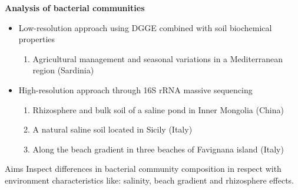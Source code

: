 \documentclass[10pt]{beamer}
\begin{document}
\begin{frame}
	\textbf{\Large{Analysis of bacterial communities}}
	\vspace{5mm}
	
	\begin{itemize}
		\item Low-resolution approach using DGGE combined with soil biochemical properties
		\begin{enumerate}
			\item Agricultural management and seasonal variations in a Mediterranean region (Sardinia)
		\end{enumerate}
		\item High-resolution approach through 16S rRNA massive sequencing
		\begin{enumerate}
			\item Rhizosphere and bulk soil of a saline pond in Inner Mongolia (China)
			\item A natural saline soil located in Sicily (Italy)
			\item Along the beach gradient in three beaches of Favignana island (Italy)		
		\end{enumerate}		
	\end{itemize}
	\vspace{3mm}
	\begin{block}{Aims}
		Inspect differences in bacterial community composition in respect with environment characteristics like: salinity, beach gradient and rhizosphere effects.
	\end{block}
\end{frame}

\end{document}
